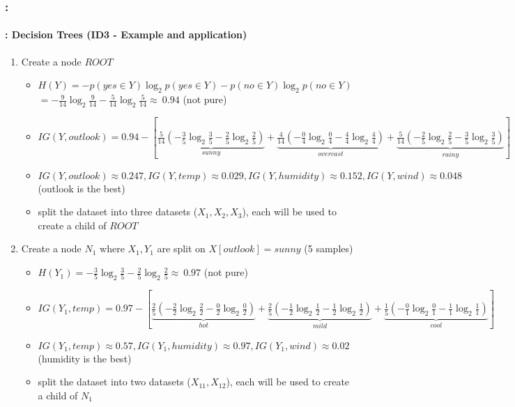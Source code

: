 \documentclass[xcolor=table]{beamer}
\begin{document}
\begin{frame}
	\frametitle{\insertshortsubtitle: \insertsection}
	\framesubtitle{\insertsubsection: Decision Trees (ID3 - Example and application)}
	\tiny
	\begin{enumerate}
		\item Create a node $ ROOT $
		\begin{itemize}\tiny\bfseries
			\item $ H(Y) = - p(yes \in Y) \log_2 p(yes\in Y) - p(no \in Y) \log_2 p(no\in Y)  $
			$ = -\frac{9}{14} \log_2 \frac{9}{14} - \frac{5}{14} \log_2 \frac{5}{14} \approx\ 0.94$ (not pure)
			\item $ IG(Y, outlook) = 0.94 - [ \underbrace{\frac{5}{14} (- \frac{3}{5} \log_2 \frac{3}{5} - \frac{2}{5} \log_2 \frac{2}{5} )}_{sunny} + \underbrace{\frac{4}{14} (- \frac{0}{4} \log_2 \frac{0}{4} - \frac{4}{4} \log_2 \frac{4}{4})}_{overcast} +  \underbrace{\frac{5}{14} (- \frac{2}{5} \log_2 \frac{2}{5} - \frac{3}{5} \log_2 \frac{3}{5})}_{rainy} ]$
			\item $ IG(Y, outlook) \approx 0.247 , IG(Y, temp) \approx 0.029 , IG(Y, humidity) \approx 0.152 ,  IG(Y, wind) \approx 0.048 $ (outlook is the best)
			\item split the dataset into three datasets ($ X_1, X_2, X_3 $), each will be used to create a child of $ ROOT $
		\end{itemize}
	
		\item Create a node $ N_1 $ where $ X_1, Y_1 $ are split on $ X[outlook] = sunny$ (5 samples)
		\begin{itemize}\tiny\bfseries
			\item $ H(Y_1) = - \frac{3}{5} \log_2 \frac{3}{5} - \frac{2}{5} \log_2 \frac{2}{5} \approx\ 0.97$ (not pure)
			\item $ IG(Y_1, temp) = 0.97 - [ \underbrace{\frac{2}{5} (- \frac{2}{2} \log_2 \frac{2}{2} - \frac{0}{2} \log_2 \frac{0}{2} )}_{hot} + \underbrace{\frac{2}{5} (- \frac{1}{2} \log_2 \frac{1}{2} - \frac{1}{2} \log_2 \frac{1}{2})}_{mild} +  \underbrace{\frac{1}{5} (- \frac{0}{1} \log_2 \frac{0}{1} - \frac{1}{1} \log_2 \frac{1}{1})}_{cool} ]$
			\item $ IG(Y_1, temp) \approx 0.57 , IG(Y_1, humidity) \approx 0.97 ,  IG(Y_1, wind) \approx 0.02 $ (humidity is the best)
			\item split the dataset into two datasets ($ X_{11}, X_{12}$), each will be used to create a child of $ N_1 $
		\end{itemize}
	

\end{enumerate}
\end{frame}
\end{document}
